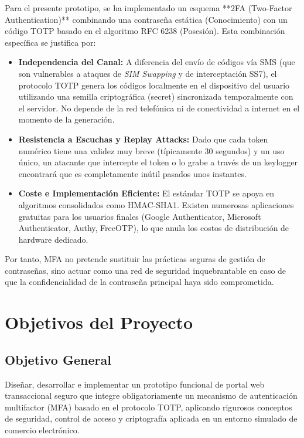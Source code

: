\documentclass[12pt,a4paper]{article}
\begin{document}
Para el presente prototipo, se ha implementado un esquema **2FA (Two-Factor Authentication)** combinando una contraseña estática (Conocimiento) con un código TOTP basado en el algoritmo RFC 6238 (Posesión). Esta combinación específica se justifica por:

\begin{itemize}
    \item \textbf{Independencia del Canal:} A diferencia del envío de códigos vía SMS (que son vulnerables a ataques de \textit{SIM Swapping} y de interceptación SS7), el protocolo TOTP genera los códigos localmente en el dispositivo del usuario utilizando una semilla criptográfica (secret) sincronizada temporalmente con el servidor. No depende de la red telefónica ni de conectividad a internet en el momento de la generación.
    \item \textbf{Resistencia a Escuchas y Replay Attacks:} Dado que cada token numérico tiene una validez muy breve (típicamente 30 segundos) y un uso único, un atacante que intercepte el token o lo grabe a través de un keylogger encontrará que es completamente inútil pasados unos instantes.
    \item \textbf{Coste e Implementación Eficiente:} El estándar TOTP se apoya en algoritmos consolidados como HMAC-SHA1. Existen numerosas aplicaciones gratuitas para los usuarios finales (Google Authenticator, Microsoft Authenticator, Authy, FreeOTP), lo que anula los costos de distribución de hardware dedicado.
\end{itemize}

Por tanto, MFA no pretende sustituir las prácticas seguras de gestión de contraseñas, sino actuar como una red de seguridad inquebrantable en caso de que la confidencialidad de la contraseña principal haya sido comprometida.

\section{Objetivos del Proyecto}

\subsection{Objetivo General}
Diseñar, desarrollar e implementar un prototipo funcional de portal web transaccional seguro que integre obligatoriamente un mecanismo de autenticación multifactor (MFA) basado en el protocolo TOTP, aplicando rigurosos conceptos de seguridad, control de acceso y criptografía aplicada en un entorno simulado de comercio electrónico.
\end{document}
